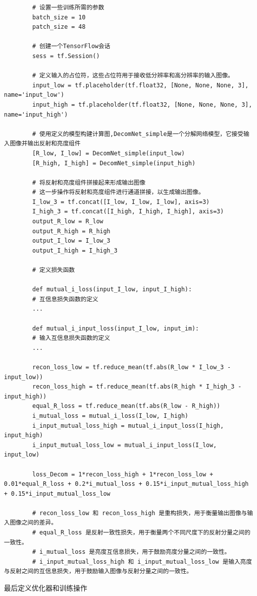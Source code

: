 \documentclass[letterpaper,12pt]{article}
\begin{document}
	
	\lstset{language=python,breaklines=true}
	\begin{lstlisting}
		# 设置一些训练所需的参数
		batch_size = 10
		patch_size = 48
		
		# 创建一个TensorFlow会话
		sess = tf.Session()
		
		# 定义输入的占位符，这些占位符用于接收低分辨率和高分辨率的输入图像。
		input_low = tf.placeholder(tf.float32, [None, None, None, 3], name='input_low')
		input_high = tf.placeholder(tf.float32, [None, None, None, 3], name='input_high')
		
		# 使用定义的模型构建计算图,DecomNet_simple是一个分解网络模型，它接受输入图像并输出反射和亮度组件
		[R_low, I_low] = DecomNet_simple(input_low)
		[R_high, I_high] = DecomNet_simple(input_high)
		
		# 将反射和亮度组件拼接起来形成输出图像
		# 这一步操作将反射和亮度组件进行通道拼接，以生成输出图像。
		I_low_3 = tf.concat([I_low, I_low, I_low], axis=3)
		I_high_3 = tf.concat([I_high, I_high, I_high], axis=3)
		output_R_low = R_low
		output_R_high = R_high
		output_I_low = I_low_3
		output_I_high = I_high_3
		
		# 定义损失函数
		
		def mutual_i_loss(input_I_low, input_I_high):
		# 互信息损失函数的定义
		...
		
		def mutual_i_input_loss(input_I_low, input_im):
		# 输入互信息损失函数的定义
		...
		
		recon_loss_low = tf.reduce_mean(tf.abs(R_low * I_low_3 - input_low))
		recon_loss_high = tf.reduce_mean(tf.abs(R_high * I_high_3 - input_high))
		equal_R_loss = tf.reduce_mean(tf.abs(R_low - R_high))
		i_mutual_loss = mutual_i_loss(I_low, I_high)
		i_input_mutual_loss_high = mutual_i_input_loss(I_high, input_high)
		i_input_mutual_loss_low = mutual_i_input_loss(I_low, input_low)
		
		loss_Decom = 1*recon_loss_high + 1*recon_loss_low + 0.01*equal_R_loss + 0.2*i_mutual_loss + 0.15*i_input_mutual_loss_high + 0.15*i_input_mutual_loss_low
		
		# recon_loss_low 和 recon_loss_high 是重构损失，用于衡量输出图像与输入图像之间的差异。
		# equal_R_loss 是反射一致性损失，用于衡量两个不同尺度下的反射分量之间的一致性。
		# i_mutual_loss 是亮度互信息损失，用于鼓励亮度分量之间的一致性。
		# i_input_mutual_loss_high 和 i_input_mutual_loss_low 是输入亮度与反射之间的互信息损失，用于鼓励输入图像与反射分量之间的一致性。
	\end{lstlisting}
	
	最后定义优化器和训练操作
	
\end{document}
